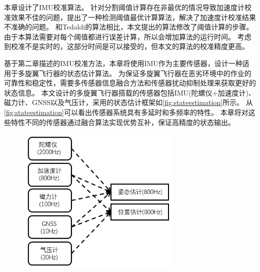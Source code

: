 \documentclass[
  type=master
]{gdutthesis}
\begin{document}
本章设计了IMU校准算法。
针对分割阈值计算存在非最优的情况导致加速度计校准效果不佳的问题，提出了一种检测阈值最优计算算法，解决了加速度计校准结果不准确的问题。
和Tedaldi的算法相比，本文提出的算法修改了阈值计算的步骤。
由于本算法需要对每个阈值都进行误差计算，所以会增加算法的运行时间。
考虑到校准不是实时的，这部分时间是可以接受的，但本文的算法的校准精度更高。

基于第二章描述的IMU校准方法，本章将使用IMU作为主要传感器，设计一种适用于多旋翼飞行器的状态估计算法。
为保证多旋翼飞行器在恶劣环境中的作业的可靠性和稳定性，需要多传感器信息融合方法和传感器扰动抑制处理来获取更好的状态信息。
本文设计的多旋翼飞行器搭载的传感器包括IMU(陀螺仪+加速度计)、磁力计、GNSS以及气压计，采用的状态估计框架如\autoref{fig:stateestimation}所示。
从\autoref{fig:stateestimation}可以看出传感器系统具有多延时和多频率的特性。
本章将对这些特性不同的传感器通过融合算法实现优势互补，保证高精度的状态输出。
\begin{figure}[H]
	\centering
	\includegraphics[width=0.7\textwidth]{屏幕截图 2022-05-05 161436.png}
	\label{fig:stateestimation}
\end{figure} 
\end{document}
